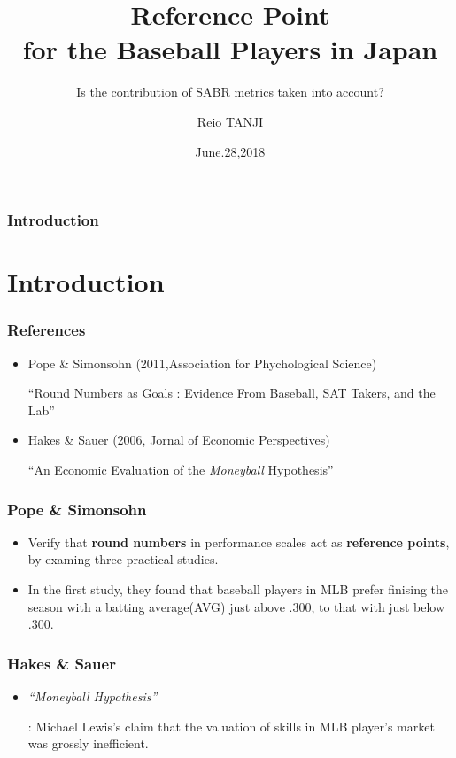 \documentclass[dvipdfmx,12pt]{beamer}
\title{Reference Point \\ for the Baseball Players in Japan}
\subtitle{Is the contribution of SABR metrics taken into account?}
\author{Reio TANJI}
\date{June.28,2018}
\institute{Osaka University}
\begin{document}
\begin{frame}\frametitle{Introduction}
\titlepage
\end{frame}

\section{Introduction}
\begin{frame}\frametitle{References}

\begin{itemize}

\item Pope \& Simonsohn (2011,Association for Phychological Science)

``Round Numbers as Goals : Evidence From Baseball, SAT Takers, and the Lab''

\item Hakes \& Sauer (2006, Jornal of Economic Perspectives)

``An Economic Evaluation of the \textit{Moneyball} Hypothesis''

\end{itemize}

\end{frame}

\begin{frame}\frametitle{Pope \& Simonsohn}

\begin{itemize}

\item Verify that \textbf{round numbers} in performance scales act as \textbf{reference points}, by examing three practical studies.

\item In the first study, they found that baseball players in MLB prefer finising the season with a batting average(AVG) just above .300, to that with just below .300.

\end{itemize}

\end{frame}

\begin{frame}\frametitle{Hakes \& Sauer}

\begin{itemize}

\item \textit{``Moneyball Hypothesis''}

: Michael Lewis's claim that the valuation of skills in MLB player's market was grossly inefficient.

\end{itemize}

\end{frame}
\end{document}
